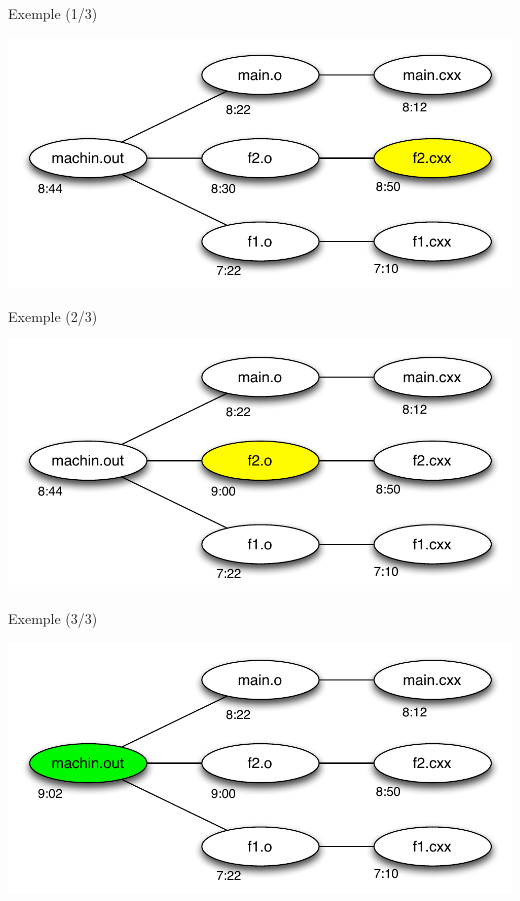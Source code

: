 \begin{frame}{Exemple (1/3)}
        \begin{center}
      \includegraphics[scale=.6]{fig/base-dependance1.pdf}
    \end{center}
\end{frame}

\begin{frame}{Exemple (2/3)}
        \begin{center}
      \includegraphics[scale=.6]{fig/base-dependance2.pdf}
    \end{center}
\end{frame}

\begin{frame}{Exemple (3/3)}
        \begin{center}
      \includegraphics[scale=.6]{fig/base-dependance3.pdf}
    \end{center}
\end{frame}

